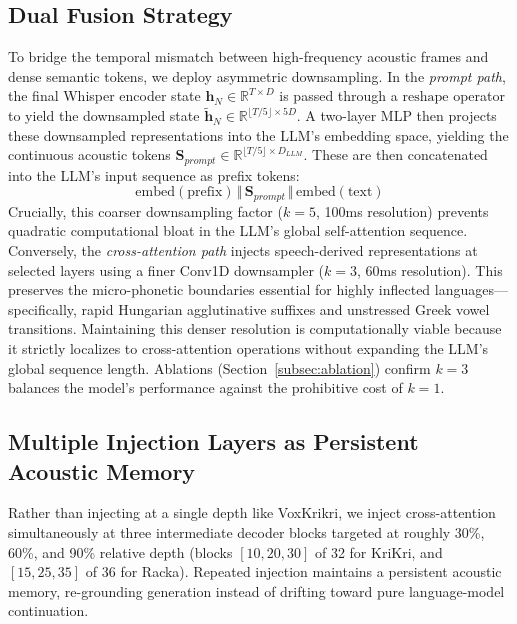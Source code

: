 \documentclass{article}
\begin{document}
\subsection{Dual Fusion Strategy}
\noindent
To bridge the temporal mismatch between high-frequency acoustic frames and dense semantic tokens, we deploy asymmetric downsampling. In the \emph{prompt path}, the final Whisper encoder state $\boldsymbol{h}_N \in \mathbb{R}^{T \times D}$ is passed through a $\mathrm{reshape}$ operator to yield the downsampled state $\tilde{\boldsymbol{h}}_N \in \mathbb{R}^{\lfloor T / 5 \rfloor \times 5D}$.  A two-layer MLP then projects these downsampled representations into the LLM's embedding space, yielding the continuous acoustic tokens $\boldsymbol{S}_{prompt} \in \mathbb{R}^{\lfloor T / 5 \rfloor \times D_{LLM}}$. These are then concatenated into the LLM's input sequence as prefix tokens:
$$\mathrm{embed}(\text{prefix}) \,\Vert{}\, \boldsymbol{S}_{prompt} \,\Vert{}\, \mathrm{embed}(\text{text})$$
Crucially, this coarser downsampling factor ($k=5$, 100ms resolution) prevents quadratic computational bloat in the LLM's global self-attention sequence.
Conversely, the \emph{cross-attention path} injects speech-derived representations at selected layers using a finer Conv1D downsampler ($k=3$, 60ms resolution). This preserves the micro-phonetic boundaries essential for highly inflected languages—specifically, rapid Hungarian agglutinative suffixes and unstressed Greek vowel transitions. Maintaining this denser resolution is computationally viable because it strictly localizes to cross-attention operations without expanding the LLM's global sequence length. Ablations (Section~\ref{subsec:ablation}) confirm $k=3$ balances the model's performance against the prohibitive cost of $k=1$.


\subsection{Multiple Injection Layers as Persistent Acoustic Memory}
\label{subsec:multiple_injection}
\noindent
Rather than injecting at a single depth like VoxKrikri, we inject cross-attention simultaneously at three intermediate decoder blocks targeted at roughly 30\%, 60\%, and 90\% relative depth (blocks $[10, 20, 30]$ of 32 for KriKri, and $[15, 25, 35]$ of 36 for Racka). Repeated injection maintains a persistent acoustic memory, re-grounding generation instead of drifting toward pure language-model continuation.
\end{document}
